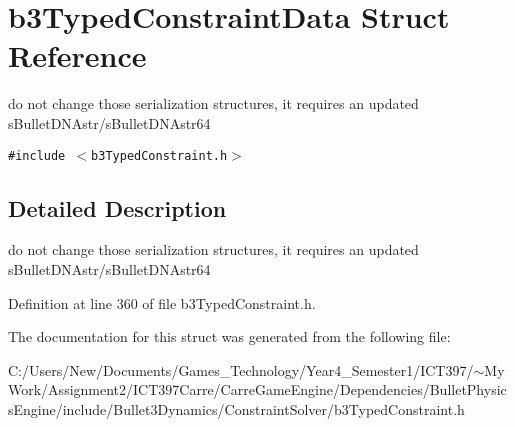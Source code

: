\hypertarget{structb3_typed_constraint_data}{
\section{b3TypedConstraintData Struct Reference}
\label{structb3_typed_constraint_data}
}
do not change those serialization structures, it requires an updated sBulletDNAstr/sBulletDNAstr64  


{\tt \#include $<$b3TypedConstraint.h$>$}



\subsection{Detailed Description}
do not change those serialization structures, it requires an updated sBulletDNAstr/sBulletDNAstr64 

Definition at line 360 of file b3TypedConstraint.h.

The documentation for this struct was generated from the following file:\begin{CompactItemize}
\item 
C:/Users/New/Documents/Games\_\-Technology/Year4\_\-Semester1/ICT397/$\sim$My Work/Assignment2/ICT397Carre/CarreGameEngine/Dependencies/BulletPhysicsEngine/include/Bullet3Dynamics/ConstraintSolver/b3TypedConstraint.h\end{CompactItemize}
